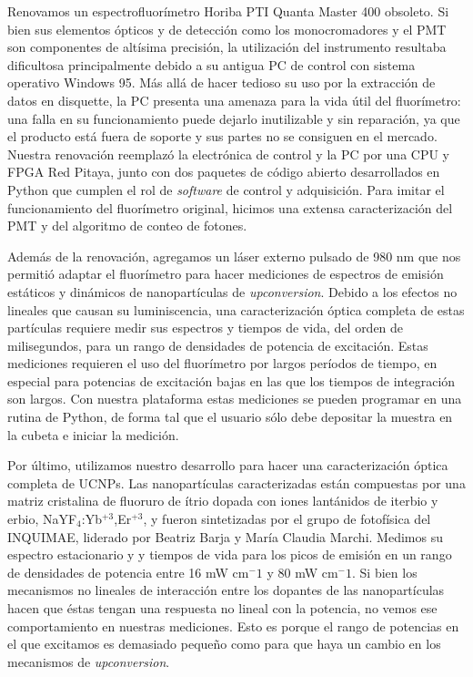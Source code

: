 Renovamos un espectrofluorímetro Horiba PTI Quanta Master 400 obsoleto.
Si bien sus elementos ópticos y de detección como los monocromadores y el PMT son componentes de altísima precisión, la utilización del instrumento resultaba dificultosa principalmente debido a su antigua PC de control con sistema operativo Windows 95.
Más allá de hacer tedioso su uso por la extracción de datos en disquette, la PC presenta una amenaza para la vida útil del fluorímetro: una falla en su funcionamiento puede dejarlo inutilizable y sin reparación, ya que el producto está fuera de soporte y sus partes no se consiguen en el mercado.
Nuestra renovación reemplazó la electrónica de control y la PC por una CPU y FPGA Red Pitaya, junto con dos paquetes de código abierto desarrollados en Python que cumplen el rol de \textit{software} de control y adquisición.
Para imitar el funcionamiento del fluorímetro original, hicimos una extensa caracterización del PMT y del algoritmo de conteo de fotones.

Además de la renovación, agregamos un láser externo pulsado de 980 nm que nos permitió adaptar el fluorímetro para hacer mediciones de espectros de emisión estáticos y dinámicos de nanopartículas de \textit{upconversion}.
Debido a los efectos no lineales que causan su luminiscencia, una caracterización óptica completa de estas partículas requiere medir sus espectros y tiempos de vida, del orden de milisegundos, para un rango de densidades de potencia de excitación.
Estas mediciones requieren el uso del fluorímetro por largos períodos de tiempo, en especial para potencias de excitación bajas en las que los tiempos de integración son largos.
Con nuestra plataforma estas mediciones se pueden programar en una rutina de Python, de forma tal que el usuario sólo debe depositar la muestra en la cubeta e iniciar la medición.

Por último, utilizamos nuestro desarrollo para hacer una caracterización óptica completa de UCNPs.
Las nanopartículas caracterizadas están compuestas por una matriz cristalina de fluoruro de ítrio dopada con iones lantánidos de iterbio y erbio, NaYF$_4$:Yb$^{+3}$,Er$^{+3}$, y fueron sintetizadas por el grupo de fotofísica del INQUIMAE, liderado por Beatriz Barja y María Claudia Marchi. 
Medimos su espectro estacionario y y tiempos de vida para los picos de emisión en un rango de densidades de potencia entre 16 mW cm$^-1$ y 80 mW cm$^-1$.
Si bien los mecanismos no lineales de interacción entre los dopantes de las nanopartículas hacen que éstas tengan una respuesta no lineal con la potencia, no vemos ese comportamiento en nuestras mediciones.
Esto es porque el rango de potencias en el que excitamos es demasiado pequeño como para que haya un cambio en los mecanismos de \textit{upconversion}.

